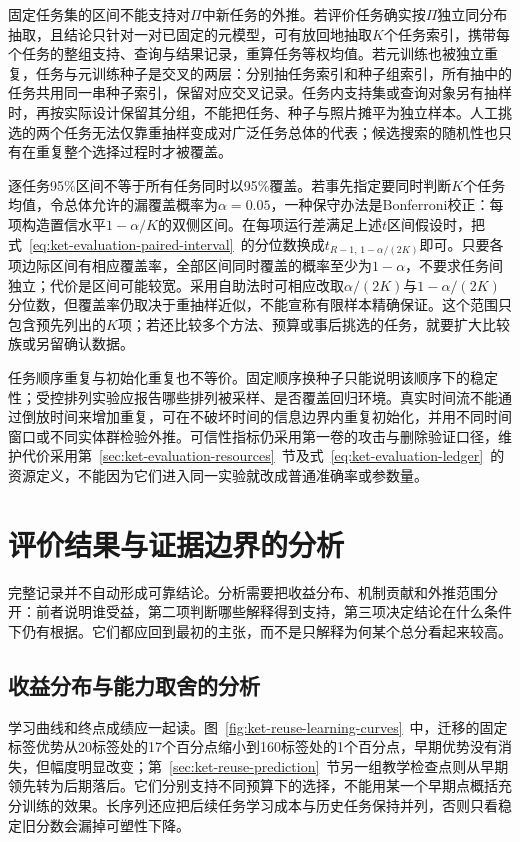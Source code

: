固定任务集的区间不能支持对$\Pi$中新任务的外推。若评价任务确实按$\Pi$独立同分布抽取，且结论只针对一对已固定的元模型，可有放回地抽取$K$个任务索引，携带每个任务的整组支持、查询与结果记录，重算任务等权均值。若元训练也被独立重复，任务与元训练种子是交叉的两层：分别抽任务索引和种子组索引，所有抽中的任务共用同一串种子索引，保留对应交叉记录。任务内支持集或查询对象另有抽样时，再按实际设计保留其分组，不能把任务、种子与照片摊平为独立样本。人工挑选的两个任务无法仅靠重抽样变成对广泛任务总体的代表；候选搜索的随机性也只有在重复整个选择过程时才被覆盖。

逐任务95\%区间不等于所有任务同时以95\%覆盖。若事先指定要同时判断$K$个任务均值，令总体允许的漏覆盖概率为$\alpha=0.05$，一种保守办法是Bonferroni校正：每项构造置信水平$1-\alpha/K$的双侧区间。在每项运行差满足上述$t$区间假设时，把式~\eqref{eq:ket-evaluation-paired-interval}~的分位数换成$t_{R-1,\,1-\alpha/(2K)}$即可。只要各项边际区间有相应覆盖率，全部区间同时覆盖的概率至少为$1-\alpha$，不要求任务间独立；代价是区间可能较宽。采用自助法时可相应改取$\alpha/(2K)$与$1-\alpha/(2K)$分位数，但覆盖率仍取决于重抽样近似，不能宣称有限样本精确保证。这个范围只包含预先列出的$K$项；若还比较多个方法、预算或事后挑选的任务，就要扩大比较族或另留确认数据。

任务顺序重复与初始化重复也不等价。固定顺序换种子只能说明该顺序下的稳定性；受控排列实验应报告哪些排列被采样、是否覆盖回归环境。真实时间流不能通过倒放时间来增加重复，可在不破坏时间的信息边界内重复初始化，并用不同时间窗口或不同实体群检验外推。可信性指标仍采用第一卷的攻击与删除验证口径，维护代价采用第~\ref{sec:ket-evaluation-resources}~节及式~\eqref{eq:ket-evaluation-ledger}~的资源定义，不能因为它们进入同一实验就改成普通准确率或参数量。

\section{评价结果与证据边界的分析}
\label{sec:ket-evaluation-analysis}

完整记录并不自动形成可靠结论。分析需要把收益分布、机制贡献和外推范围分开：前者说明谁受益，第二项判断哪些解释得到支持，第三项决定结论在什么条件下仍有根据。它们都应回到最初的主张，而不是只解释为何某个总分看起来较高。

\subsection{收益分布与能力取舍的分析}
\label{sec:ket-evaluation-distribution}

学习曲线和终点成绩应一起读。图~\ref{fig:ket-reuse-learning-curves}~中，迁移的固定标签优势从20标签处的17个百分点缩小到160标签处的1个百分点，早期优势没有消失，但幅度明显改变；第~\ref{sec:ket-reuse-prediction}~节另一组教学检查点则从早期领先转为后期落后。它们分别支持不同预算下的选择，不能用某一个早期点概括充分训练的效果。长序列还应把后续任务学习成本与历史任务保持并列，否则只看稳定旧分数会漏掉可塑性下降。

